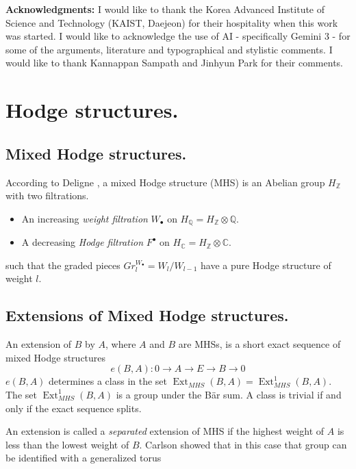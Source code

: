 \documentclass[12pt,reqno]{article}
\newcommand {\ZZ}{{\mathds Z}}
\newcommand {\C}{{\mathds C}}
\newcommand {\Q}{{\mathds Q}}
\def\Ext{\operatorname{Ext}}
\begin{document}
	 
	
	{\bf Acknowledgments:} I would like to thank the Korea Advanced Institute of Science and Technology (KAIST, Daejeon) for their hospitality when this work was started. I would like to acknowledge the use of AI - specifically Gemini 3 - for some of the arguments, literature and typographical and stylistic comments. I would like to thank Kannappan Sampath and Jinhyun Park for their comments. 
		
		\section{Hodge structures.}
		
		\subsection{Mixed Hodge structures.}
		
		According to Deligne \cite{deli}, a mixed Hodge structure (MHS) is an Abelian group $H_{\ZZ}$ with two filtrations. 
		
		\begin{itemize}
			\item  An increasing  {\em weight filtration} $W_{\bullet}$ on $H_{\Q}=H_{\ZZ} \otimes \Q$. 
			
			\item A decreasing {\em Hodge filtration} $F^{\bullet}$ on $H_{\C}=H_{\ZZ}\otimes \C$.
		\end{itemize}
	such that the graded pieces $Gr^{W_{\bullet}}_l = W_l/W_{l-1}$ 
    have a pure Hodge structure of weight $l$.  
		
		
	\subsection{Extensions of Mixed Hodge structures.}
	
	An extension of $B$ by $A$, where $A$ and $B$ are MHSs, is a short exact sequence of mixed Hodge structures  
	$$e(B,A):0 \rightarrow A \rightarrow E \rightarrow B \rightarrow 0$$
	$e(B,A)$ determines a class in the set $\Ext_{MHS}(B,A)=\Ext^1_{MHS}(B,A)$. The set $\Ext_{MHS}^1(B,A)$ is a group under the B\"ar sum. A class is trivial if and only if the exact sequence splits. 
	
	
	An extension is called a {\em separated} extension of MHS if the  highest weight of $A$ is less than the lowest weight of $B$. Carlson \cite{carl} showed that in this case that group can be identified with a generalized torus 
	
\end{document}
